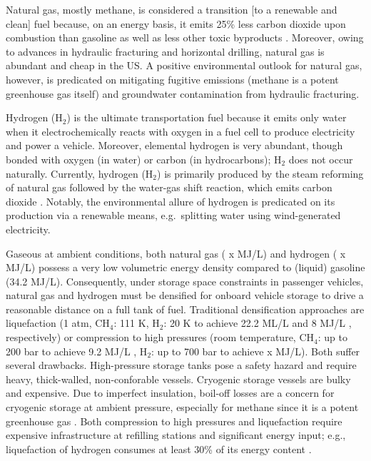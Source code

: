 \documentclass{nature}
\begin{document}
Natural gas, mostly methane, is considered a transition [to a renewable and clean] fuel because, on an energy basis, it emits 25\% less carbon dioxide upon combustion than gasoline \cite{eia2013much} as well as less other toxic byproducts \cite{wang2000full}. Moreover, owing to advances in hydraulic fracturing and horizontal drilling, natural gas is abundant \cite{usnatgassupply} and cheap in the US. A positive environmental outlook for natural gas, however, is predicated on mitigating fugitive emissions (methane is a potent greenhouse gas itself) \cite{alvarez2012greater} and groundwater contamination \cite{osborn2011methane} from hydraulic fracturing.

Hydrogen (H$_2$) is the ultimate transportation fuel because it emits only water when it electrochemically reacts with oxygen in a fuel cell to produce electricity and power a vehicle. Moreover, elemental hydrogen is very abundant, though bonded with oxygen (in water) or carbon (in hydrocarbons); H$_2$ does not occur naturally. Currently, hydrogen (H$_2$) is primarily produced by the steam reforming of natural gas followed by the water-gas shift reaction, which emits carbon dioxide \cite{crabtree2004hydrogen}. Notably, the environmental allure of hydrogen is predicated on its production via a renewable means, e.g.\ splitting water using wind-generated electricity.

Gaseous at ambient conditions, both natural gas ({\color{red} x} MJ/L) and hydrogen ({\color{red} x} MJ/L) possess a very low volumetric energy density compared to (liquid) gasoline (34.2 MJ/L). Consequently, under storage space constraints in passenger vehicles, natural gas and hydrogen must be densified for onboard vehicle storage to drive a reasonable distance on a full tank of fuel. Traditional densification approaches are liquefaction (1 atm, CH$_4$: 111 K, H$_2$: 20 K to achieve 22.2 ML/L \cite{makal2012methane} and 8 MJ/L \cite{suh2011hydrogen}, respectively) or compression to high pressures (room temperature, CH$_4$: up to 200 bar to achieve 9.2 MJ/L \cite{makal2012methane}, H$_2$: up to 700 bar to achieve {\color{red} x} MJ/L). Both suffer several drawbacks. High-pressure storage tanks pose a safety hazard and require heavy, thick-walled, non-conforable vessels. Cryogenic storage vessels are bulky and expensive. Due to imperfect insulation, boil-off losses are a concern for cryogenic storage at ambient pressure, especially for methane since it is a potent greenhouse gas \cite{hasan2009minimizing}. Both compression to high pressures and liquefaction require expensive infrastructure at refilling stations and significant energy input; e.g., liquefaction of hydrogen consumes at least 30\% of its energy content \cite{bossel2003energy}.
\end{document}
